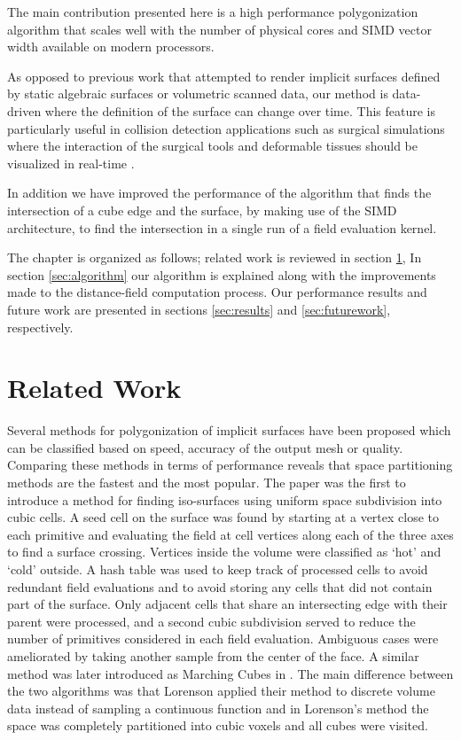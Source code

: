 The main contribution presented here is a high performance polygonization algorithm that scales well with the 
number of physical cores and SIMD vector width available on modern processors.

As opposed to previous work that attempted to render implicit surfaces defined by static algebraic surfaces or 
volumetric scanned data, our method is data-driven where the definition of the surface can change over time. This feature 
is particularly useful in collision detection applications such as surgical simulations where the interaction
of the surgical tools and deformable tissues should be visualized in real-time \cite{Laycock2007}. 
 
In addition we have improved the performance of the algorithm that finds the intersection of a cube edge and the surface, by making use of the SIMD architecture, 
to find the intersection in a single run of a field evaluation kernel.


The chapter is organized as follows;  related work is reviewed in section \ref{sec:relatedwork}, 
In section \ref{sec:algorithm} our algorithm is explained along with the improvements made to the 
distance-field computation process. Our performance results and future work are presented 
in sections \ref{sec:results} and \ref{sec:futurework}, respectively.

\section{Related Work}\label{sec:relatedwork}
Several methods for polygonization of implicit surfaces have been proposed which can be 
classified based on speed, accuracy of the output mesh or quality.  Comparing these methods in terms of performance reveals that space 
partitioning methods are the fastest and the most popular. The paper \cite{Wyvill1986} was the first to introduce a method for finding 
iso-surfaces using uniform space subdivision into cubic cells. A seed cell on the surface was found by starting at a vertex close to 
each primitive and evaluating the field at cell vertices along each of the three axes to find a surface crossing. Vertices inside the 
volume were classified as `hot' and `cold' outside. A hash table was used to keep track of processed cells to avoid redundant field 
evaluations and to avoid storing any cells that did not contain part of the surface. Only adjacent cells that share an intersecting edge 
with their parent were processed, and a second cubic subdivision served to reduce the number of primitives considered in each field evaluation. 
Ambiguous cases were ameliorated by taking another sample from the center of the face.
A similar method was later introduced as Marching Cubes in \cite{Lorensen1987}. The main difference between the two algorithms was that 
Lorenson \etal applied their method to discrete volume data instead of sampling a continuous function and in Lorenson's method
the space was completely partitioned into cubic voxels and all cubes were visited.


